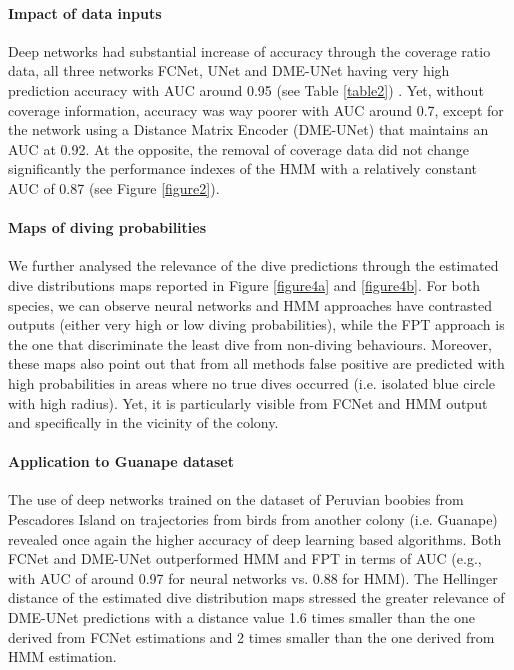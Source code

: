 \documentclass{article}
\begin{document}
\paragraph{Impact of data inputs}
Deep networks had substantial increase of accuracy through the coverage ratio data, all three networks FCNet, UNet and DME-UNet having very high prediction accuracy with AUC around 0.95 (see Table \ref{table2}) .
Yet, without coverage information, accuracy was way poorer with AUC around 0.7, except for the network using a Distance Matrix Encoder (DME-UNet) that maintains an AUC at 0.92.
At the opposite, the removal of coverage data did not change significantly the performance indexes of the HMM with a relatively constant AUC of 0.87 (see Figure \ref{figure2}).

\paragraph{Maps of diving probabilities}
We further analysed the relevance of the dive predictions through the estimated dive distributions maps reported in Figure \ref{figure4a} and \ref{figure4b}. For both species, we can observe neural networks and HMM approaches have contrasted outputs (either very high or low diving probabilities), while the FPT approach is the one that discriminate the least dive from non-diving behaviours. Moreover, these maps also point out that from all methods false positive are predicted with high probabilities in areas where no true dives occurred (i.e. isolated blue circle with high radius). Yet, it is particularly visible from FCNet and HMM output and specifically in the vicinity of the colony.

\paragraph{Application to Guanape dataset}
The use of deep networks trained on the dataset of Peruvian boobies from Pescadores Island on trajectories from birds from another colony (i.e. Guanape) revealed once again the higher accuracy of deep learning based algorithms. Both FCNet and DME-UNet outperformed HMM and FPT in terms of AUC (e.g., with AUC of around 0.97 for neural networks vs. 0.88 for HMM). The Hellinger distance of the estimated dive distribution maps stressed the greater relevance of DME-UNet predictions with a distance value 1.6 times smaller than the one derived from FCNet estimations and 2 times smaller than the one derived from HMM estimation.
\end{document}

